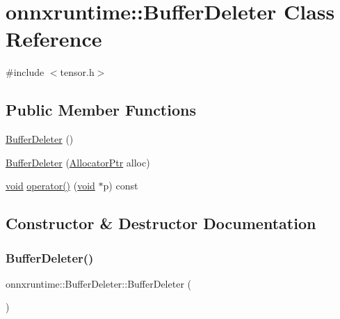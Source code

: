 \hypertarget{classonnxruntime_1_1BufferDeleter}{}\section{onnxruntime\+:\+:Buffer\+Deleter Class Reference}
\label{classonnxruntime_1_1BufferDeleter}


{\ttfamily \#include $<$tensor.\+h$>$}

\subsection*{Public Member Functions}
\begin{DoxyCompactItemize}
\item 
\mbox{\hyperlink{classonnxruntime_1_1BufferDeleter_aa4339390a44341c8813e5aabdd622881}{Buffer\+Deleter}} ()
\item 
\mbox{\hyperlink{classonnxruntime_1_1BufferDeleter_a8873f6b8b51bcf62df2bf497784cc2cc}{Buffer\+Deleter}} (\mbox{\hyperlink{namespaceonnxruntime_a6cdac724c5dcefded3a63f08dae58fda}{Allocator\+Ptr}} alloc)
\item 
\mbox{\hyperlink{mlasi_8h_a88f941d423cb2a819b70a1358982b1a6}{void}} \mbox{\hyperlink{classonnxruntime_1_1BufferDeleter_acadc194811841e20569ad25b55f2ee86}{operator()}} (\mbox{\hyperlink{mlasi_8h_a88f941d423cb2a819b70a1358982b1a6}{void}} $\ast$p) const
\end{DoxyCompactItemize}


\subsection{Constructor \& Destructor Documentation}
\mbox{\label{classonnxruntime_1_1BufferDeleter_aa4339390a44341c8813e5aabdd622881}} 
\subsubsection{\texorpdfstring{Buffer\+Deleter()}{BufferDeleter()}\hspace{0.1cm}{\footnotesize\ttfamily [1/2]}}
{\footnotesize\ttfamily onnxruntime\+::\+Buffer\+Deleter\+::\+Buffer\+Deleter (\begin{DoxyParamCaption}{ }\end{DoxyParamCaption})\hspace{0.3cm}{\ttfamily [inline]}}

